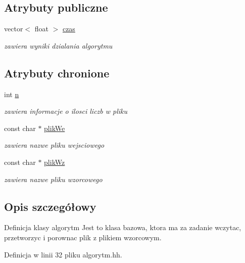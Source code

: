 \subsection*{\-Atrybuty publiczne}
\begin{DoxyCompactItemize}
\item 
vector$<$ float $>$ \hyperlink{classalgorytm_aac9e2179e0e956dbe0dc1239ebadb2e4}{czas}
\begin{DoxyCompactList}\small\item\em zawiera wyniki dzialania algorytmu \end{DoxyCompactList}\end{DoxyCompactItemize}
\subsection*{\-Atrybuty chronione}
\begin{DoxyCompactItemize}
\item 
int \hyperlink{classalgorytm_a2778c37f0ec06a30b7d494501c40e91a}{n}
\begin{DoxyCompactList}\small\item\em zawiera informacje o ilosci liczb w pliku \end{DoxyCompactList}\item 
const char $\ast$ \hyperlink{classalgorytm_ab911ca0437df967d0240651855e5a2a3}{plik\-We}
\begin{DoxyCompactList}\small\item\em zawiera nazwe pliku wejsciowego \end{DoxyCompactList}\item 
const char $\ast$ \hyperlink{classalgorytm_a19c2be15efb3e5e34bf177d50b746d93}{plik\-Wz}
\begin{DoxyCompactList}\small\item\em zawiera nazwe pliku wzorcowego \end{DoxyCompactList}\end{DoxyCompactItemize}


\subsection{\-Opis szczegółowy}
\-Definicja klasy algorytm \-Jest to klasa bazowa, ktora ma za zadanie wczytac, przetworzyc i porownac plik z plikiem wzorcowym. 

\-Definicja w linii 32 pliku algorytm.\-hh.



